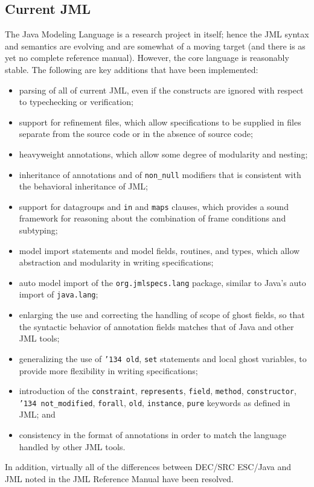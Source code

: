 \documentclass{sig-alternate}
\begin{document}
\subsection{Current JML}
The Java Modeling Language is a research project in itself; hence the
JML syntax and semantics are evolving and are somewhat of a moving
target (and there is as yet no complete reference manual).  However,
the core language is reasonably stable.  The following are key
additions that have been implemented:
\setlength{\partopsep}{0in}\setlength{\parskip}{0in}\setlength{\itemsep}{0in}\setlength{\topsep}{0in}
\begin{itemize}
\setlength{\partopsep}{0in}\setlength{\parskip}{0in}\setlength{\itemsep}{0in}\setlength{\topsep}{0in}
\item parsing of all of current JML, even if the constructs are
  ignored with respect to typechecking or verification;
\item support for refinement files, which allow specifications to be supplied in files separate from the source code or in the absence of source code;
\item heavyweight annotations, which allow some degree of modularity and nesting;
\item inheritance of annotations and of \texttt{non\_null}
  modifiers that is consistent with the behavioral inheritance of JML;
\item support for datagroups and \texttt{in} and \texttt{maps} clauses, which provides a sound framework for reasoning about the combination of frame conditions and subtyping;
\item model import statements and model fields, routines, and types, which allow abstraction 
and modularity in writing specifications;
\item auto model import of the \texttt{org.jmlspecs.lang} package, similar to Java's auto import of \texttt{java.lang};
\item enlarging the use and correcting the handling of scope of ghost fields, so that the syntactic behavior 
of annotation fields matches that of Java and other JML tools;
\item generalizing the use of \texttt{\char'134 old}, \texttt{set} statements and local ghost variables, to provide more flexibility in writing specifications;
\item introduction of the \texttt{constraint}, \texttt{represents}, \texttt{field}, \texttt{method},
\texttt{constructor}, 
\texttt{\char'134 not\_modified}, \texttt{forall}, \texttt{old},
\texttt{instance}, \texttt{pure} keywords as defined in JML; and
\item consistency in the format of annotations in order to match the language handled by other JML tools.
\end{itemize}
In addition, virtually all of the differences between DEC/SRC ESC/Java
and JML noted in the JML Reference Manual have been resolved.
\end{document}
